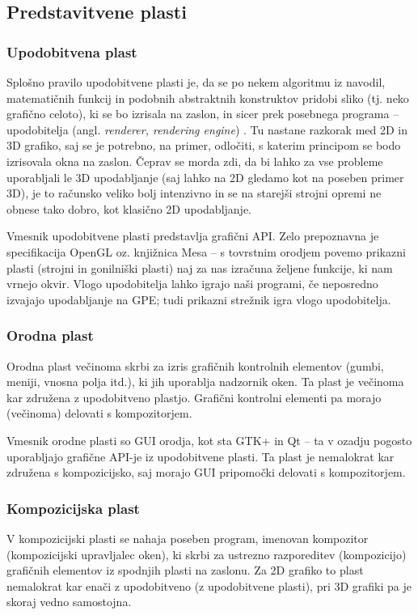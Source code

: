 \documentclass{article}
\begin{document}
\subsection{Predstavitvene plasti}
\subsubsection{Upodobitvena plast}
Splošno pravilo upodobitvene plasti je, da se po nekem algoritmu iz navodil, matematičnih funkcij in podobnih abstraktnih konstruktov pridobi sliko (tj. neko grafično celoto), ki se bo izrisala na zaslon, in sicer prek posebnega programa -- upodobitelja (angl. \textit{renderer, rendering engine}) \autocite{renderer}. Tu nastane razkorak med 2D in 3D grafiko, saj se je potrebno, na primer, odločiti, s katerim principom se bodo izrisovala okna na zaslon. Čeprav se morda zdi, da bi lahko za vse probleme uporabljali le 3D upodabljanje (saj lahko na 2D gledamo kot na poseben primer 3D), je to računsko veliko bolj intenzivno in se na starejši strojni opremi ne obnese tako dobro, kot klasično 2D upodabljanje.

Vmesnik upodobitvene plasti predstavlja grafični API. Zelo prepoznavna je specifikacija OpenGL oz. knjižnica Mesa -- s tovrstnim orodjem povemo prikazni plasti (strojni in gonilniški plasti) naj za nas izračuna željene funkcije, ki nam vrnejo okvir.
Vlogo upodobitelja lahko igrajo naši programi, če neposredno izvajajo upodabljanje na GPE; tudi prikazni strežnik igra vlogo upodobitelja.

\subsubsection{Orodna plast}
Orodna plast večinoma skrbi za izris grafičnih kontrolnih elementov (gumbi, meniji, vnosna polja itd.), ki jih uporablja nadzornik oken. Ta plast je večinoma kar združena z upodobitveno plastjo. Grafični kontrolni elementi pa morajo (večinoma) delovati s kompozitorjem.

Vmesnik orodne plasti so GUI orodja, kot sta GTK+ in Qt -- ta v ozadju pogosto uporabljajo grafične API-je iz upodobitvene plasti. Ta plast je nemalokrat kar združena s kompozicijsko, saj morajo GUI pripomočki delovati s kompozitorjem.

\subsubsection{Kompozicijska plast}
V kompozicijski plasti se nahaja poseben program, imenovan kompozitor (kompozicijski upravljalec oken), ki skrbi za ustrezno razporeditev (kompozicijo) grafičnih elementov iz spodnjih plasti na zaslonu. Za 2D grafiko to plast nemalokrat kar enači z upodobitveno (z upodobitvene plasti), pri 3D grafiki pa je skoraj vedno samostojna.
\end{document}
